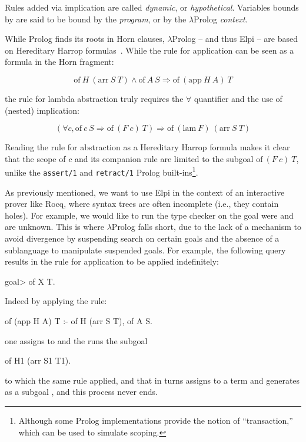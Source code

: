 \documentclass[a4paper, 11pt]{book}
\begin{document}
Rules added via implication are called \emph{dynamic}, or \emph{hypothetical}.
Variables bounds by  are said to be bound by the \emph{program},
or by the $\lambda$Prolog \emph{context}.


While Prolog finds its roots in Horn clauses, $\lambda$Prolog -- and thus Elpi -- are
based on Hereditary Harrop formulas~\cite{Miller_Nadathur_2012}. While the rule
for application can be seen as a formula in the Horn fragment:

$$
\mathrm{of}~ H~(\mathrm{arr}~S~T) \land \mathrm{of}~A~S \Rightarrow
\mathrm{of}~(\mathrm{app}~H~A)~T
$$

\noindent the rule for lambda abstraction truly requires the $\forall$
quantifier and the use of (nested) implication:

$$
(\forall c, \mathrm{of}~c~S \Rightarrow  \mathrm{of}~(F~c)~T) \Rightarrow
\mathrm{of}~(\mathrm{lam}~F)~(\mathrm{arr}~S~T)
$$

Reading the rule for abstraction as a Hereditary Harrop formula makes it clear
that the scope of $c$ and its companion rule are limited to the subgoal
$\mathrm{of}~(F~c)~T$, unlike the \texttt{assert/1} and \texttt{retract/1}
Prolog built-ins\footnote{Although some Prolog implementations provide the
notion of ``transaction,'' which can be used to simulate scoping.}.

As previously mentioned, we want to use Elpi in the context of an interactive
prover like Rocq, where syntax trees are often incomplete (i.e., they contain
holes). For example, we would like to run the type checker on the goal
 were  and  are unknown.
This is where $\lambda$Prolog falls short, due to the
lack of a mechanism to avoid divergence by suspending search on certain goals
and the absence of a sublanguage to manipulate suspended goals.
For example, the following query results in the rule for application to
be applied indefinitely:
\begin{elpicode}
goal> of X T. %
\end{elpicode}
Indeed by applying the rule:
\begin{elpicode}
of (app H A) T :- of H (arr S T), of A S.
\end{elpicode}
one assigns  to  and the runs the subgoal
\begin{elpicode}
of H1 (arr S1 T1). 
\end{elpicode}
to which the same rule applied, and that in turns assigns to 
a term  and generates as a subgoal ,
and this process never ends.
\end{document}
